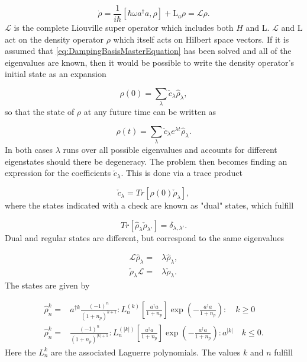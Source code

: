 \documentclass[12pt]{article}
\begin{document}
\begin{equation}\label{eq:DampingBasisMasterEquation}
    \dot{\rho} = \frac{1}{i\hbar}[\hbar \omega a^\dagger a,\rho] +\mathrm{L}_a\rho = \mathcal{L}\rho.
\end{equation} $\mathcal{L}$ is the complete Liouville super operator which includes both $H$ and $\mathrm{L}$. $\mathcal{L}$ and $\mathrm{L}$ act on the density operator $\rho$ which itself acts on Hilbert space vectors. If it is assumed that \ref{eq:DampingBasisMasterEquation} has been solved and all of the eigenvalues are known, then it would be possible to write the density operator's initial state as an expansion

\begin{equation}
    \rho(0) = \sum_{\lambda} \check{c}_{\lambda} \hat{\rho}_{\lambda}, 
\end{equation} so that the state of $\rho$ at any future time can be written as

\begin{equation}
    \rho(t) = \sum_{\lambda} \check{c}_{\lambda} e^{\lambda t}\hat{\rho}_{\lambda}. 
\end{equation} In both cases $\lambda$ runs over all possible eigenvalues and accounts for different eigenstates should there be degeneracy. The problem then becomes finding an expression for the coefficients $\check{c}_{\lambda}$. This is done via a trace product

\begin{equation}
    \check{c}_\lambda = Tr[\rho(0)\check{\rho}_\lambda],
\end{equation} where the states indicated with a check are known as "dual" states, which fulfill

\begin{equation}
    Tr[\hat{\rho}_{\lambda} \check{\rho}_{\lambda'}] = \delta_{\lambda,\lambda'}. 
\end{equation} Dual and regular states are different, but correspond to the same eigenvalues

\begin{align}
    \mathcal{L}\hat{\rho}_\lambda =& \lambda \hat{\rho}_\lambda, \\
    \check{\rho}_\lambda\mathcal{L} =& \lambda \check{\rho}_\lambda.
\end{align} The states are given by

\begin{align}
  \hat{\rho}_n^k=& a^{\dagger k} \frac{(-1)^{n}}{(1+n_p)^{k+1}}: L_{n}^{(k)}\left[\frac{a^{\dagger} a}{1+n_p}\right] \exp (-\frac{a^{\dagger} a}{1+n_p}):  \quad k \geq 0 \nonumber\\
    \hat{\rho}_n^k=& \frac{(-1)^{n}}{(1+n_p)^{|k|+1}}: L_{n}^{(|k|)}\left[\frac{a^{\dagger} a}{1+n_p}\right] \exp (-\frac{a^{\dagger} a}{1+n_p}): a^{|k|}  \quad k \leq 0 . \nonumber
\end{align} Here the $L_n^k$ are the associated Laguerre polynomials. The values $k$ and $n$ fulfill
\end{document}
